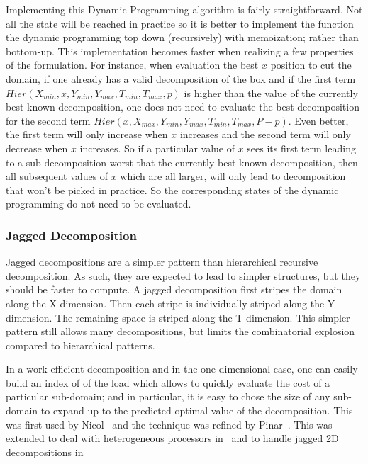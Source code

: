 \documentclass{article}
\begin{document}
Implementing this Dynamic Programming algorithm is fairly straightforward.
Not all the state will be reached in practice so it is better
to implement the function the dynamic programming top down
(recursively) with memoization; rather than bottom-up. This
implementation becomes faster when realizing a few properties of the
formulation. For instance, when evaluation the best $x$ position to
cut the domain, if one already has a valid decomposition of the box
and if the first term $Hier(X_{min}, x, Y_{min}, Y_{max}, T_{min},
T_{max}, p)$ is higher than the value of the currently best known
decomposition, one does not need to evaluate the best decomposition
for the second term $Hier(x, X_{max}, Y_{min}, Y_{max}, T_{min},
T_{max}, P-p)$.  Even better, the first term will only increase when
$x$ increases and the second term will only decrease when $x$
increases. So if a particular value of $x$ sees its first term leading
to a sub-decomposition worst that the currently best known
decomposition, then all subsequent values of $x$ which are all larger,
will only lead to decomposition that won't be picked in practice. So
the corresponding states of the dynamic programming do not need to be evaluated.

\subsubsection{Jagged Decomposition}

\label{sec:jagged}

Jagged decompositions are a simpler pattern than hierarchical
recursive decomposition. As such, they are expected to lead to simpler
structures, but they should be faster to compute. A jagged
decomposition first stripes the domain along the X dimension. Then
each stripe is individually striped along the Y dimension. The remaining
space is striped along the T dimension. This simpler pattern still allows
many decompositions, but limits the combinatorial explosion compared
to hierarchical patterns.

In a work-efficient decomposition and in the one dimensional case, one
can easily build an index of of the load which allows to quickly
evaluate the cost of a particular sub-domain; and in particular, it is
easy to chose the size of any sub-domain to expand up to the predicted
optimal value of the decomposition. This was first used by
Nicol~\cite{nicol94} and the technique was refined by
Pinar~\cite{pinar04}. This was extended to deal with heterogeneous processors
in~\cite{pinar08} and to handle jagged 2D decompositions in~\cite{saule12-jpdc-spart}
\end{document}
